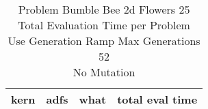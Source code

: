 \begin{table}[H]
\caption{Problem  Bumble Bee 2d  Flowers 25\\Total Evaluation Time per Problem \\ Use Generation Ramp  Max Generations 52\\ No Mutation \\}
\begin{center}
\scalebox{1.0} %
{
\begin{tabular}{lllr}
\hline
kern & adfs & what & total eval time \\
\hline


\end{tabular}
}
\end{center}
\end{table}

